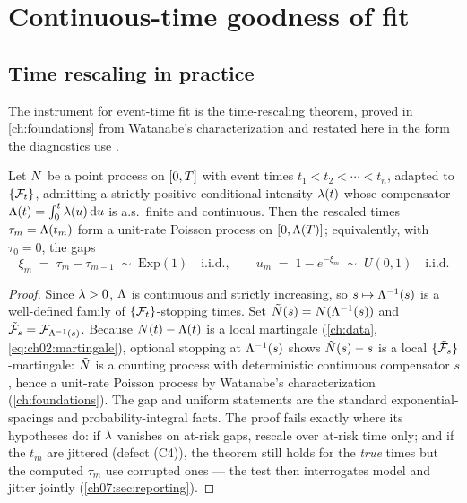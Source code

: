 \section{Continuous-time goodness of fit}\label{ch07:sec:continuous}

\subsection{Time rescaling in practice}\label{ch07:sec:rescaling}

The instrument for event-time fit is the time-rescaling theorem, proved in
\cref{ch:foundations} from Watanabe's characterization and restated here
in the form the diagnostics use \citep{brown2002,ogata1988,daley2003}.

\begin{theorem}\label{thm:ch07:rescale}
Let $N$ be a point process on $[0,T]$ with event times
$t_1 < t_2 < \cdots < t_n$, adapted to $\{\mathcal{F}_{t}\}$, admitting a strictly
positive conditional intensity $\lambda(t)$ whose compensator
$\Lambda(t)=\int_0^t \lambda(u)\,\mathrm{d} u$ is a.s.\ finite and continuous. Then the
rescaled times $\tau_m = \Lambda(t_m)$ form a unit-rate Poisson process on
$[0,\Lambda(T)]$; equivalently, with $\tau_0=0$, the gaps
\begin{equation}\label{eq:ch07:gaps}
\xi_m \;=\; \tau_m - \tau_{m-1} \;\sim\; \mathrm{Exp}(1)
\quad\text{i.i.d.},
\qquad
u_m \;=\; 1 - e^{-\xi_m} \;\sim\; U(0,1)
\quad\text{i.i.d.}
\end{equation}
\end{theorem}

\begin{proof}
Since $\lambda>0$, $\Lambda$ is continuous and strictly increasing, so
$s\mapsto\Lambda^{-1}(s)$ is a well-defined family of $\{\mathcal{F}_{t}\}$-stopping
times. Set $\tilde{N}(s)=N(\Lambda^{-1}(s))$ and
$\tilde{\mathcal{F}}_s = \mathcal{F}_{\Lambda^{-1}(s)}$. Because
$N(t)-\Lambda(t)$ is a local martingale
(\cref{ch:data}, \cref{eq:ch02:martingale}), optional stopping at
$\Lambda^{-1}(s)$ shows $\tilde{N}(s)-s$ is a local
$\{\tilde{\mathcal{F}}_s\}$-martingale: $\tilde{N}$ is a counting process with
deterministic continuous compensator $s$, hence a unit-rate Poisson
process by Watanabe's characterization (\cref{ch:foundations}). The gap
and uniform statements are the standard exponential-spacings and
probability-integral facts. The proof fails exactly where its hypotheses
do: if $\lambda$ vanishes on at-risk gaps, rescale over at-risk time only;
and if the $t_m$ are jittered (defect (C4)), the theorem still holds for
the \emph{true} times but the computed $\tau_m$ use corrupted ones --- the
test then interrogates model and jitter jointly
(\cref{ch07:sec:reporting}).
\end{proof}

